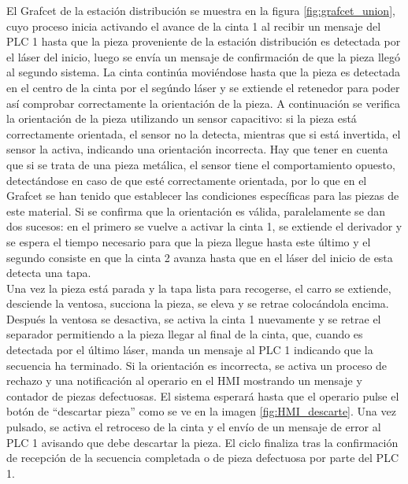 El Grafcet de la estación distribución se muestra en la figura \ref{fig:grafcet_union}, cuyo proceso inicia activando el avance de la cinta 1 al recibir un mensaje del PLC 1 hasta que la pieza proveniente de la estación distribución es detectada por el láser del inicio, luego se envía un mensaje de confirmación de que la pieza llegó al segundo sistema. La cinta continúa moviéndose hasta que la pieza es detectada en el centro de la cinta por el segúndo láser y se extiende el retenedor para poder así comprobar correctamente la orientación de la pieza. A continuación se verifica la orientación de la pieza utilizando un sensor capacitivo: si la pieza está correctamente orientada, el sensor no la detecta, mientras que si está invertida, el sensor la activa, indicando una orientación incorrecta. Hay que tener en cuenta que si se trata de una pieza metálica, el sensor tiene el comportamiento opuesto, detectándose en caso de que esté correctamente orientada, por lo que en el Grafcet se han tenido que establecer las condiciones específicas para las piezas de este material. Si se confirma que la orientación es válida, paralelamente se dan dos sucesos: en el primero se vuelve a activar la cinta 1, se extiende el derivador y se espera el tiempo necesario para que la pieza llegue hasta este último y el segundo consiste en que la cinta 2 avanza hasta que en el láser del inicio de esta detecta una tapa. \\

Una vez la pieza está parada y la tapa lista para recogerse, el carro se extiende, desciende la ventosa, succiona la pieza, se eleva y se retrae colocándola encima. Después la ventosa se desactiva, se activa la cinta 1 nuevamente y se retrae el separador permitiendo a la pieza llegar al final de la cinta, que, cuando es detectada por el último láser, manda un mensaje al PLC 1 indicando que la secuencia ha terminado. Si la orientación es incorrecta, se activa un proceso de rechazo y una notificación al operario en el HMI mostrando un mensaje y contador de piezas defectuosas. El sistema esperará hasta que el operario pulse el botón de “descartar pieza” como se ve en la imagen \ref{fig:HMI_descarte}. Una vez pulsado, se activa el retroceso de la cinta y el envío de un mensaje de error al PLC 1 avisando que debe descartar la pieza. El ciclo finaliza tras la confirmación de recepción de la secuencia completada o de pieza defectuosa por parte del PLC 1.

\clearpage
 

